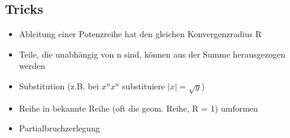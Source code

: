 \documentclass[a4paper,12pt]{article} %
\begin{document}
\subsection{Tricks}
\begin{itemize}
\item Ableitung einer Potenzreihe hat den gleichen Konvergenzradius R
\item Teile, die unabhängig von n sind, können aus der Summe herausgezogen werden
\item Substitution (z.B. bei $x^n x^n$ substituiere $|x| = \sqrt{y} $)
\item Reihe in bekannte Reihe (oft die geom. Reihe, R = 1) umformen
\item Partialbruchzerlegung
\end{itemize}
\end{document}
